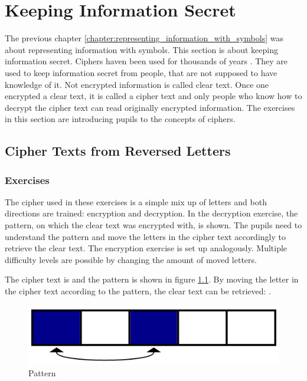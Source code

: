 \chapter{Keeping Information Secret}
\label{chapter:keepingInformationSecret}

The previous chapter \ref{chapter:representing_information_with_symbols} was about representing information with symbols. This section is about keeping information secret.
Ciphers haven been used for thousands of years \cite{HistoryOfCryptography}. They are used to keep information secret from people, that are not supposed to have knowledge of it. Not encrypted information is called clear text. Once one encrypted a clear text, it is called a cipher text and only people who know how to decrypt the cipher text can read originally encrypted information.
The exercises in this section are introducing pupils to the concepts of ciphers.

\section{Cipher Texts from Reversed Letters}
\label{section:patterns}

\subsection{Exercises}
The cipher used in these exercises is a simple mix up of letters and both directions are trained: encryption and decryption. In the decryption exercise, the pattern, on which the clear text was encrypted with, is shown. The pupils need to understand the pattern and move the letters in the cipher text accordingly to retrieve the clear text. The encryption exercise is set up analogously. Multiple difficulty levels are possible by changing the amount of moved letters.

\begin{example}
    The cipher text is  and the pattern is shown in figure \ref{fig:pattern}. By moving the letter in the cipher text according to the pattern, the clear text can be retrieved: .
\end{example}

\begin{figure} 
    \centering
    \includegraphics[width=0.4 \columnwidth]{figures/pattern.png}
    \caption{Pattern} 
    \label{fig:pattern} 
\end{figure}

